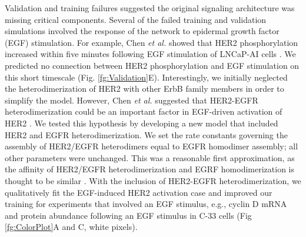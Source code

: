 \documentclass[12pt]{article}
\begin{document}
Validation and training failures suggested the original signaling architecture was missing critical components. 
Several of the failed training and validation simulations involved the response of the network to epidermal growth factor (EGF) stimulation. 
For example, Chen \textit{et al.} showed that HER2 phosphorylation increased within five minutes following EGF stimulation of LNCaP-AI cells \citep{Chen2011}. 
We predicted no connection between HER2 phosphorylation and EGF stimulation on this short timescale (Fig. \ref{fg:Validation}E). 
Interestingly, we initially neglected the heterodimerization of HER2 with other ErbB family members in order to simplify the model.
However, Chen \textit{et al.} suggested that HER2-EGFR heterodimerization could be an important factor in EGF-driven activation of HER2 \cite{Chen2011}. 
We tested this hypothesis by developing a new model that included HER2 and EGFR heterodimerization. 
We set the rate constants governing the assembly of HER2/EGFR heterodimers equal to EGFR homodimer assembly; all other parameters were unchanged.
This was a reasonable first approximation, as the affinity of HER2/EGFR heterodimerization and EGRF homodimerization is thought to be similar \cite{Hendriks2003}. 
With the inclusion of HER2-EGFR heterodimerization, we qualitatively fit the EGF-induced HER2 activation case and improved our training for experiments that involved an EGF stimulus, e.g., cyclin D mRNA and protein abundance following an EGF stimulus in C-33 cells (Fig \ref{fg:ColorPlot}A and C, white pixels).   

\end{document}
